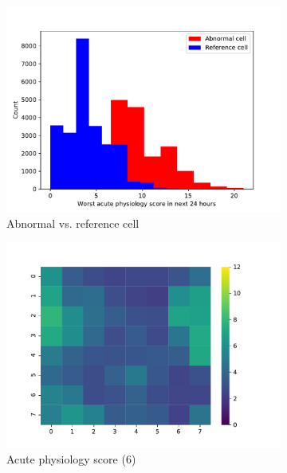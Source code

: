 \begin{figure}[h!]

\centering
\begin{subfigure}[t]{0.30\textwidth}
\centering
\includegraphics[scale=0.30]{./figures/icu_somvaeprob/distribution_cells}
\caption{Abnormal vs. reference cell}
\end{subfigure}
\begin{subfigure}[t]{0.30\textwidth}
\centering
\includegraphics[scale=0.30]{./figures/icu_somvaeprob/detail_heatmaps_full_score_6}
\caption{Acute physiology score (6)}
\end{subfigure}
\begin{subfigure}[t]{0.30\textwidth}
\centering

\end{subfigure}
\end{figure}
